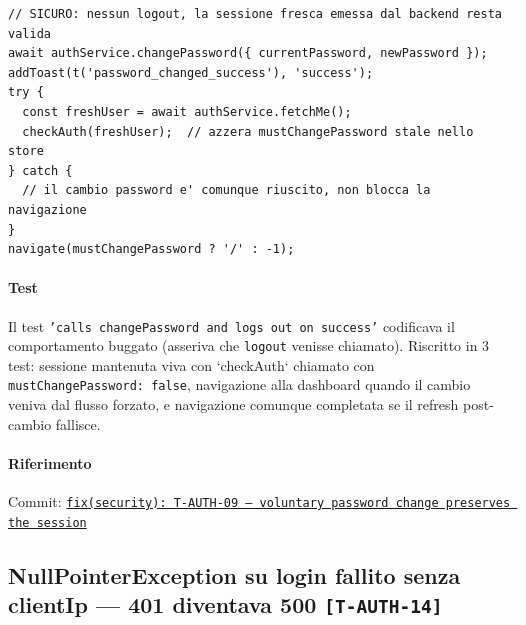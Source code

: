 ﻿\documentclass[a4paper,12pt]{report}
\newcommand{\commitref}[2]{\texttt{\small \href{https://github.com/diegoandruccioli/hotel-pms/commit/#1}{#2}}}
\newcommand{\threat}[1]{\texttt{\small\textcolor{vulnred}{[#1]}}}
\begin{document}
\begin{securebox}[title={Codice Sicuro --- SettingsPassword.tsx (fix)}]
\begin{lstlisting}[style=java]
// SICURO: nessun logout, la sessione fresca emessa dal backend resta valida
await authService.changePassword({ currentPassword, newPassword });
addToast(t('password_changed_success'), 'success');
try {
  const freshUser = await authService.fetchMe();
  checkAuth(freshUser);  // azzera mustChangePassword stale nello store
} catch {
  // il cambio password e' comunque riuscito, non blocca la navigazione
}
navigate(mustChangePassword ? '/' : -1);
\end{lstlisting}
\end{securebox}

\paragraph{Test}
Il test \texttt{'calls changePassword and logs out on success'} codificava
il comportamento buggato (asseriva che \texttt{logout} venisse chiamato).
Riscritto in 3 test: sessione mantenuta viva con `checkAuth` chiamato con
\texttt{mustChangePassword: false}, navigazione alla dashboard quando il
cambio veniva dal flusso forzato, e navigazione comunque completata se il
refresh post-cambio fallisce.

\paragraph{Riferimento} Commit: \commitref{[pending]}{fix(security): T-AUTH-09 --- voluntary password change preserves the session}

\subsection{NullPointerException su login fallito senza clientIp --- 401 diventava 500 \threat{T-AUTH-14}}
\end{document}
